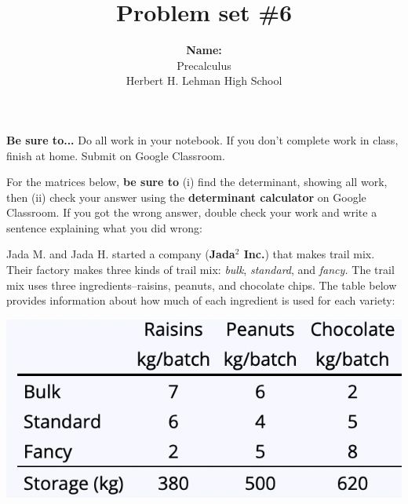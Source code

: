 \documentclass{exam}
\title{Problem set \#6}
\author{ \textbf{Name: }  \enspace\hrulefill \\ Precalculus \\ Herbert H. Lehman High School }
\begin{document}
\maketitle
\thispagestyle{empty}

\noindent\textbf{Be sure to...} Do all work in your notebook.  If you don't complete work in class, finish at home. Submit on Google Classroom.
\begin{questions}
\question 
For the matrices below, \textbf{be sure to} (i) find the determinant, showing all work, then (ii) check your answer using the \textbf{determinant calculator} on Google Classroom.  If you got the wrong answer, double check your work and write a sentence explaining what you did wrong:

\question 
Jada M. and Jada H. started a company (\textbf{Jada$^2$ Inc.}) that makes trail mix.  Their factory makes three kinds of trail mix: \textit{bulk}, \textit{standard}, and \textit{fancy.} The trail mix uses three ingredients--raisins, peanuts, and chocolate chips. The table below provides information about how much of each ingredient is used for each variety:

\includegraphics[scale=0.5]{table.png}


\end{questions}
\end{document}
